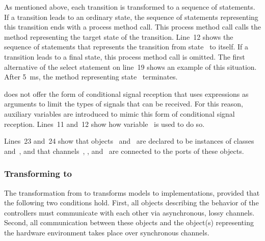 As mentioned above, each transition is transformed to a sequence of statements.
If a transition leads to an ordinary state, the sequence of statements representing this transition ends with a process method call.
This process method call calls the method representing the target state of the transition.
Line~12 shows the sequence of statements that represents the transition from state~ to itself.
If a transition leads to a final state, this process method call is omitted.
The first alternative of the select statement on line~19 shows an example of this situation.
After 5~ms, the method representing state~ terminates.

\POOSL does not offer the form of conditional signal reception that uses expressions as arguments to limit the types of signals that can be received.
For this reason, auxiliary variables are introduced to mimic this form of conditional signal reception.
Lines~11 and~12 show how variable~ is used to do so.

Lines~23 and~24 show that objects~ and~ are declared to be instances of classes~ and~, and that channels~, , and~ are connected to the ports of these objects.




\subsubsection{Transforming \SLCO to \NQC}
\label{sec:slco:transformation-to-nqc}

The transformation from \SLCO to \NQC transforms \SLCO models to \NQC implementations, provided that the following two conditions hold.
First, all objects describing the behavior of the controllers must communicate with each other via asynchronous, lossy channels.
Second, all communication between these objects and the object(s) representing the hardware environment takes place over synchronous channels.


